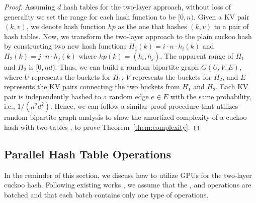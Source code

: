 \begin{proof}
Assuming $d$ hash tables for the two-layer approach, without loss of generality we set the range for each hash function to be $[0,n)$. Given a KV pair $(k,v)$, we denote hash function $hp$ as the one that hashes $(k,v)$ to a pair of hash tables.
Now, we transform the two-layer approach to the plain cuckoo hash by constructing two new hash functions $H_1(k) = i \cdot n \cdot h_i(k)$ and $H_2(k) = j \cdot n \cdot h_j(k)$ where $hp(k) = (h_i,h_j)$.
The apparent range of $H_1$ and $H_2$ is $[0,nd)$. Thus, we can build a random bipartite graph $G(U,V,E)$, where $U$ represents the buckets for $H_1$, $V$ represents the buckets for $H_2$, and $E$ represents the KV pairs connecting the two buckets from $H_1$ and $H_2$. 
Each KV pair is independently hashed to a random edge $e \in E$ with the same probability, i.e., $1/(n^2d^2)$. Hence, we can follow a similar proof procedure that utilizes random bipartite graph analysis to show the amortized complexity of a cuckoo hash with two tables \cite{kutzelnigg:hal-01184689}, to prove Theorem~\ref{them:complexity}.
\end{proof}



\subsection{Parallel Hash Table Operations}\label{sec:vot:con}
In the reminder of this section, we discuss how to utilize GPUs for the two-layer cuckoo hash. Following existing works \cite{alcantara2009real,zhang2015mega,breslow2016horton}, we assume that the ,  and  operations are batched and that each batch contains only one type of operations. 


